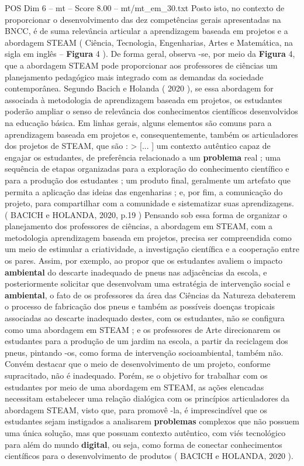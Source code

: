 \begin{textsample}{POS Dim 6 – mt – Score 8.00 – mt/mt\_em\_30.txt}
Posto isto, no contexto de proporcionar o desenvolvimento das dez competências gerais apresentadas na BNCC, é de suma relevância articular a aprendizagem baseada em projetos e a abordagem STEAM ( Ciência, Tecnologia, Engenharias, Artes e Matemática, na sigla em inglês – \textbf{Figura} 4 ).
De forma geral, observa -se, por meio da \textbf{Figura} 4, que a abordagem STEAM pode proporcionar aos professores de ciências um planejamento pedagógico mais integrado com as demandas da sociedade contemporânea.
Segundo Bacich e Holanda ( 2020 ), se essa abordagem for associada à metodologia de aprendizagem baseada em projetos, os estudantes poderão ampliar o senso de relevância dos conhecimentos científicos desenvolvidos na educação básica.
Em linhas gerais, alguns elementos são comuns para a aprendizagem baseada em projetos e, consequentemente, também os articuladores dos projetos de STEAM, que são : > [... ] um contexto autêntico capaz de engajar os estudantes, de preferência relacionado a um \textbf{problema} real ; uma sequência de etapas organizadas para a exploração do conhecimento científico e para a produção dos estudantes ; um produto final, geralmente um artefato que permita a aplicação das ideias das engenharias ; e, por fim, a comunicação do projeto, para compartilhar com a comunidade e sistematizar suas aprendizagens. ( BACICH e HOLANDA, 2020, p.19 ) Pensando sob essa forma de organizar o planejamento dos professores de ciências, a abordagem em STEAM, com a metodologia aprendizagem baseada em projetos, precisa ser compreendida como um meio de estimular a criatividade, a investigação científica e a cooperação entre os pares.
Assim, por exemplo, ao propor que os estudantes avaliem o impacto \textbf{ambiental} do descarte inadequado de pneus nas adjacências da escola, e posteriormente solicitar que desenvolvam uma estratégia de intervenção social e \textbf{ambiental}, o fato de os professores da área das Ciências da Natureza debaterem o processo de fabricação dos pneus e também as possíveis doenças tropicais associadas ao descarte inadequado destes, com os estudantes, não se configura como uma abordagem em STEAM ; e os professores de Arte direcionarem os estudantes para a produção de um jardim na escola, a partir da reciclagem dos pneus, pintando -os, como forma de intervenção socioambiental, também não.
Convém destacar que o meio de desenvolvimento de um projeto, conforme supracitado, não é inadequado.
Porém, se o objetivo for trabalhar com os estudantes por meio de uma abordagem em STEAM, as ações elencadas necessitam estabelecer uma relação dialógica com os princípios articuladores da abordagem STEAM, visto que, para promovê -la, é imprescindível que os estudantes sejam instigados a analisarem \textbf{problemas} complexos que não possuem uma única solução, mas que possuam contexto autêntico, com viés tecnológico para além do mundo \textbf{digital}, ou seja, como forma de conectar conhecimentos científicos para o desenvolvimento de produtos ( BACICH e HOLANDA, 2020 ).

\end{textsample}
